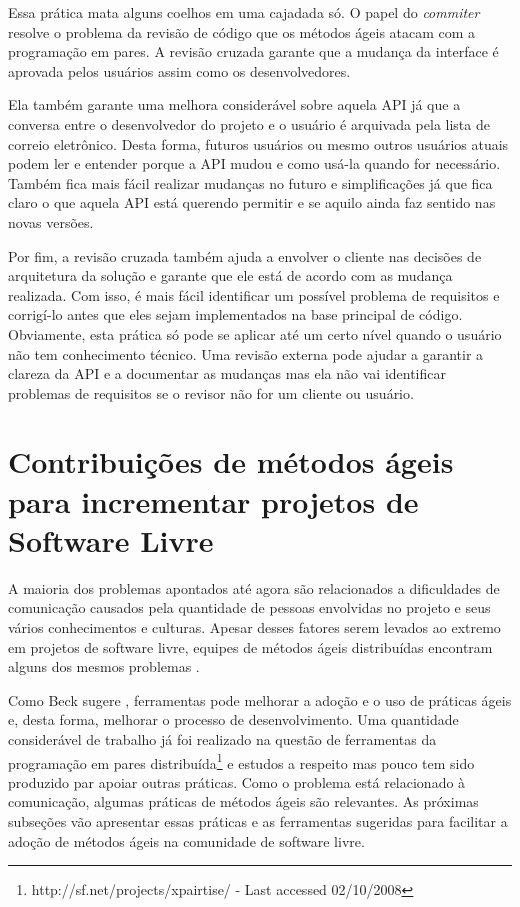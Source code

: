 Essa prática mata alguns coelhos em uma cajadada só. O papel do
\emph{commiter} resolve o problema da revisão de código que os métodos
ágeis atacam com a programação em pares. A revisão cruzada garante que
a mudança da interface é aprovada pelos usuários assim como os
desenvolvedores.

Ela também garante uma melhora considerável sobre aquela API já que a
conversa entre o desenvolvedor do projeto e o usuário é arquivada pela
lista de correio eletrônico. Desta forma, futuros usuários ou mesmo
outros usuários atuais podem ler e entender porque a API mudou e como
usá-la quando for necessário. Também fica mais fácil realizar mudanças
no futuro e simplificações já que fica claro o que aquela API está
querendo permitir e se aquilo ainda faz sentido nas novas versões.

Por fim, a revisão cruzada também ajuda a envolver o cliente nas
decisões de arquitetura da solução e garante que ele está de acordo
com as mudança realizada. Com isso, é mais fácil identificar um
possível problema de requisitos e corrigí-lo antes que eles sejam
implementados na base principal de código. Obviamente, esta prática só
pode se aplicar até um certo nível quando o usuário não tem
conhecimento técnico. Uma revisão externa pode ajudar a garantir a
clareza da API e a documentar as mudanças mas ela não vai identificar
problemas de requisitos se o revisor não for um cliente ou usuário.

\section{Contribuições de métodos ágeis para incrementar projetos de
  Software Livre}
\label{sec:agile-improve-os}

A maioria dos problemas apontados até agora são relacionados a
dificuldades de comunicação causados pela quantidade de pessoas
envolvidas no projeto e seus vários conhecimentos e culturas. Apesar
desses fatores serem levados ao extremo em projetos de software livre,
equipes de métodos ágeis distribuídas encontram alguns dos mesmos
problemas \cite{Sutherland2007,Maurer2002}.

Como Beck sugere \cite{Beck2008}, ferramentas pode melhorar a adoção e o uso de práticas ágeis e, desta forma, melhorar o processo de desenvolvimento. Uma quantidade considerável de trabalho já foi realizado na questão de ferramentas da programação em pares distribuída\footnote{http://sf.net/projects/xpairtise/ - Last
  accessed 02/10/2008} e estudos a respeito \cite{Nagappan2003} mas pouco tem sido produzido par apoiar outras práticas. Como o problema está relacionado à comunicação, algumas práticas de métodos ágeis são relevantes. As próximas subseções vão apresentar essas práticas e as ferramentas sugeridas para facilitar a adoção de métodos ágeis na comunidade de software livre.

